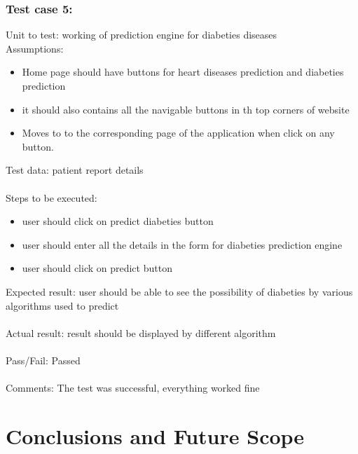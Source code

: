 \documentclass[oneside,12pt]{Classes/VTU}
\begin{document}
	\subsection{Test case 5:}
	Unit to test: working of prediction engine for diabeties diseases \\
	Assumptions:\\
	\begin{itemize}
		\item Home page should have buttons for heart diseases prediction and diabeties prediction
		\item it should also contains all the navigable buttons in th top corners of website
		\item Moves to to the corresponding page of the application when click on any button.
	\end{itemize}
	Test data: patient report details\\
	\\
	Steps to be executed:\\
	\begin{itemize}
		\item user should click on predict diabeties button
		\item user should enter all the details in the form for diabeties prediction engine
		\item user should click on predict button
	\end{itemize}
	Expected result:  user should be able to see the possibility of diabeties by various algorithms used to predict\\
	\\
	Actual result: result should be displayed by different algorithm\\
	\\
	Pass/Fail: Passed\\
	\\
	Comments: The test was successful, everything worked fine
	
	
	\def\baselinestretch{1}
	\chapter{Conclusions and Future Scope}
	\def\baselinestretch{1.66}
\end{document}
